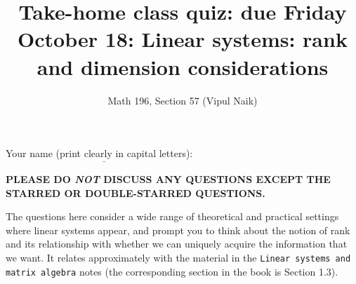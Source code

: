 \documentclass[10pt]{amsart}
\title{Take-home class quiz: due Friday October 18: Linear systems: rank and dimension considerations}
\author{Math 196, Section 57 (Vipul Naik)}
\begin{document}
\maketitle

Your name (print clearly in capital letters): $\underline{\qquad\qquad\qquad\qquad\qquad\qquad\qquad\qquad\qquad\qquad}$

{\bf PLEASE DO {\em NOT} DISCUSS ANY QUESTIONS EXCEPT THE STARRED OR DOUBLE-STARRED QUESTIONS.}

The questions here consider a wide range of theoretical and practical
settings where linear systems appear, and prompt you to think about
the notion of rank and its relationship with whether we can uniquely
acquire the information that we want. It relates approximately with
the material in the {\tt Linear systems and matrix algebra} notes (the
corresponding section in the book is Section 1.3).
\end{document}
